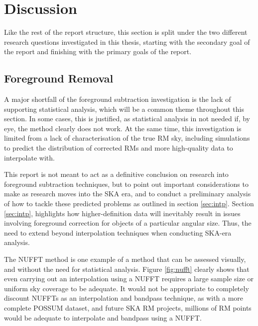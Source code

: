 \chapter{Discussion}
\label{cha:discussion}

Like the rest of the report structure, this section is split under the two different research questions investigated in this thesis, starting with the secondary goal of the report and finishing with the primary goals of the report.

\section{Foreground Removal}
\label{sec:fr_disc}

A major shortfall of the foreground subtraction investigation is the lack of supporting statistical analysis, which will be a common theme throughout this section. In some cases, this is justified, as statistical analysis in not needed if, by eye, the method clearly does not work. At the same time, this investigation is limited from a lack of characterisation of the true RM sky, including simulations to predict the distribution of corrected RMs and more high-quality data to interpolate with.


This report is not meant to act as a definitive conclusion on research into foreground subtraction techniques, but to point out important considerations to make as research moves into the SKA era, and to conduct a preliminary analysis of how to tackle these predicted problems as outlined in section \ref{sec:intp}. Section \ref{sec:intp}, highlights how higher-definition data will inevitably result in issues involving foreground correction for objects of a particular angular size. Thus, the need to extend beyond interpolation techniques when conducting SKA-era analysis.


The NUFFT method is one example of a method that can be assessed visually, and without the need for statistical analysis. Figure \ref{fig:nufft} clearly shows that even carrying out an interpolation using a NUFFT requires a large sample size or uniform sky coverage to be adequate. It would not be appropriate to completely discount NUFFTs as an interpolation and bandpass technique, as with a more complete POSSUM dataset, and future SKA RM projects, millions of RM points would be adequate to interpolate and bandpass using a NUFFT.


